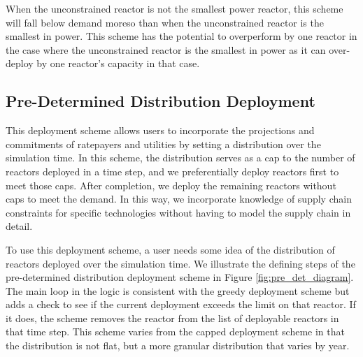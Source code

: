 When the unconstrained reactor is not the smallest power reactor, this scheme
will fall below demand moreso than when the unconstrained reactor is the
smallest in power. This scheme has the potential to overperform by one reactor
in the case where the unconstrained reactor is the smallest in power as it can
over-deploy by one reactor's capacity in that case.

\subsection{Pre-Determined Distribution Deployment}
\label{sec:pre_determined_distribution_deployment}
This deployment scheme allows users to incorporate the projections and
commitments of ratepayers and utilities by setting a distribution over the
simulation time. In this scheme, the distribution serves as a cap to the
number of reactors deployed in a time step, and we preferentially
deploy reactors first to meet those caps. After completion, we deploy the
remaining reactors without caps to meet the demand. In this way, we incorporate
knowledge of supply chain constraints for specific technologies without having
to model the supply chain in detail.

To use this deployment scheme, a user needs some idea of the distribution of
reactors deployed over the simulation time. We illustrate the defining steps of
the pre-determined distribution deployment scheme in Figure
\ref{fig:pre_det_diagram}. The main loop in the logic is consistent with the
greedy deployment scheme but adds a check to see if the current deployment
exceeds the limit on that reactor. If it does, the scheme removes the reactor
from the list of deployable reactors in that time step. This scheme varies from
the capped deployment scheme in that the distribution is not flat, but a more
granular distribution that varies by year.

